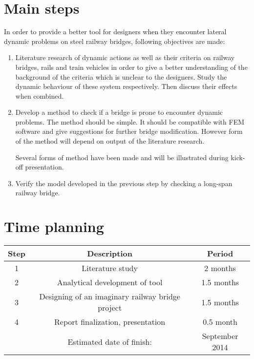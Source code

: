 \documentclass{report}
\begin{document}
\section*{Main steps}

In order to provide a better tool for designers when they encounter lateral dynamic problems on steel railway bridges, following objectives are made:

\begin{enumerate}

\item Literature research of dynamic actions as well as their criteria on railway bridges, rails and train vehicles in order to give a better understanding of the background of the criteria which is unclear to the designers. Study the dynamic behaviour of these system respectively. Then discuss their effects when combined.

\item Develop a method to check if a bridge is prone to encounter dynamic problems. The method should be simple. It should be compatible with FEM software and give suggestions for further bridge modification. However form of the method will depend on output of the literature research.

Several forms of method have been made and will be illustrated during kick-off presentation.

\item Verify the model developed in the previous step by checking a long-span railway bridge. 

\end{enumerate}


\section*{Time planning}

\begin{tabular}{c|c|c}
    \hline
    Step & Description & Period \\
    \hline
    1 & Literature study & 2 months \\
    2 & Analytical development of tool & 1.5 months \\
    3 & Designing of an imaginary railway bridge project & 1.5 months \\
    4 & Report finalization, presentation & 0.5 month \\
    \hline
    & Estimated date of finish: & September 2014  \\
\end{tabular}
\end{document}

